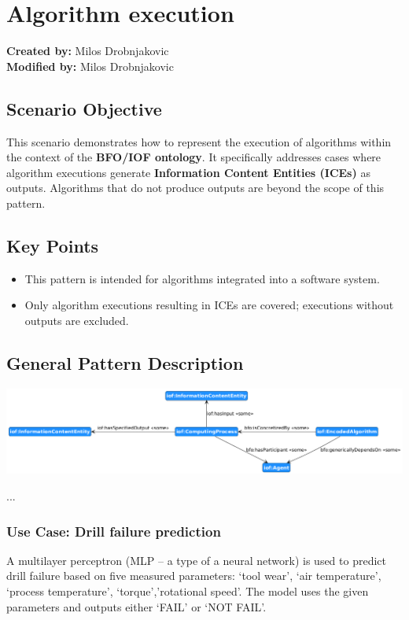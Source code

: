 \section{Algorithm execution}
\label{sec-algorithm-execution}

\textbf{Created by:} Milos Drobnjakovic \\
\textbf{Modified by:} Milos Drobnjakovic \\

\subsection*{Scenario Objective}


This scenario demonstrates how to represent the execution of algorithms within the context of the \textbf{BFO/IOF ontology}. It specifically addresses cases where algorithm executions generate \textbf{Information Content Entities (ICEs)} as outputs. Algorithms that do not produce outputs are beyond the scope of this pattern.

\subsection*{Key Points}
\begin{itemize}
    \item This pattern is intended for algorithms integrated into a software system.
    \item Only algorithm executions resulting in ICEs are covered; executions without outputs are excluded.
\end{itemize}


\subsection*{General Pattern Description}
\includegraphics[scale=0.4]{scenarios/algorithm-execution/images/algorithm-execution-general.png}

...

\subsubsection*{Use Case: Drill failure prediction} 
A multilayer perceptron (MLP – a type of a neural network) is used to predict drill failure based on five measured parameters: ‘tool wear’, ‘air temperature’, ‘process temperature’, ‘torque’,’rotational speed’. The model uses the given parameters and outputs either ‘FAIL’ or ‘NOT FAIL’.


